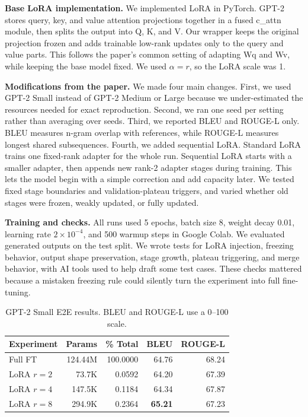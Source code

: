 \documentclass[11pt]{article}
\begin{document}
\textbf{Base LoRA implementation.} We implemented LoRA in PyTorch. GPT-2 stores query, key, and value attention projections together in a fused c\_attn module, then splits the output into Q, K, and V. Our wrapper keeps the original projection frozen and adds trainable low-rank updates only to the query and value parts. This follows the paper's common setting of adapting Wq and Wv, while keeping the base model fixed. We used $\alpha=r$, so the LoRA scale was 1.

\textbf{Modifications from the paper.} We made four main changes. First, we used GPT-2 Small instead of GPT-2 Medium or Large because we under-estimated the resources needed for exact reproduction. Second, we ran one seed per setting rather than averaging over seeds. Third, we reported BLEU and ROUGE-L only. BLEU measures n-gram overlap with references, while ROUGE-L measures longest shared subsequences. Fourth, we added sequential LoRA. Standard LoRA trains one fixed-rank adapter for the whole run. Sequential LoRA starts with a smaller adapter, then appends new rank-2 adapter stages during training. This lets the model begin with a simple correction and add capacity later. We tested fixed stage boundaries and validation-plateau triggers, and varied whether old stages were frozen, weakly updated, or fully updated.

\textbf{Training and checks.} All runs used 5 epochs, batch size 8, weight decay 0.01, learning rate $2\times10^{-4}$, and 500 warmup steps in Google Colab. We evaluated generated outputs on the test split. We wrote tests for LoRA injection, freezing behavior, output shape preservation, stage growth, plateau triggering, and merge behavior, with AI tools used to help draft some test cases. These checks mattered because a mistaken freezing rule could silently turn the experiment into full fine-tuning.

\begin{table}[h]
\centering
\scriptsize
\begin{tabular}{lrrrr}
\toprule
Experiment & Params & \% Total & BLEU & ROUGE-L \\
\midrule
Full FT & 124.44M & 100.0000 & 64.76 & 68.24 \\
LoRA $r=2$ & 73.7K & 0.0592 & 64.20 & 67.39 \\
LoRA $r=4$ & 147.5K & 0.1184 & 64.34 & 67.87 \\
LoRA $r=8$ & 294.9K & 0.2364 & \textbf{65.21} & 67.23 \\
\bottomrule
\end{tabular}
\caption{GPT-2 Small E2E results. BLEU and ROUGE-L use a 0--100 scale.}
\end{table}
\end{document}
